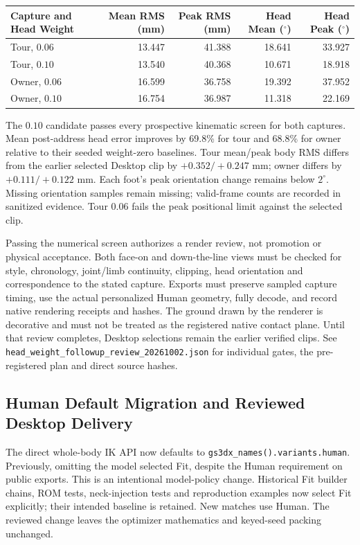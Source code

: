 \documentclass[11pt,a4paper]{article}
\begin{document}
\begin{center}
\begin{tabular}{lrrrr}
\toprule
Capture and Head Weight & Mean RMS (mm) & Peak RMS (mm) & Head Mean ($^\circ$) & Head Peak ($^\circ$) \\
\midrule
Tour, $0.06$ & 13.447 & 41.388 & 18.641 & 33.927 \\
Tour, $0.10$ & 13.540 & 40.368 & 10.671 & 18.918 \\
Owner, $0.06$ & 16.599 & 36.758 & 19.392 & 37.952 \\
Owner, $0.10$ & 16.754 & 36.987 & 11.318 & 22.169 \\
\bottomrule
\end{tabular}
\end{center}
The $0.10$ candidate passes every prospective kinematic screen for both
captures. Mean post-address head error improves by 69.8\% for tour and
68.8\% for owner relative to their seeded weight-zero baselines. Tour
mean/peak body RMS differs from the earlier selected Desktop clip by
$+0.352/+0.247$ mm; owner differs by $+0.111/+0.122$ mm. Each foot's peak
orientation change remains below $2^\circ$. Missing orientation samples
remain missing; valid-frame counts are recorded in sanitized evidence.
Tour $0.06$ fails the peak positional limit against the selected clip.

Passing the numerical screen authorizes a render review, not promotion or
physical acceptance. Both face-on and down-the-line views must be checked
for style, chronology, joint/limb continuity, clipping, head orientation
and correspondence to the stated capture. Exports must preserve sampled
capture timing, use the actual personalized Human geometry, fully decode,
and record native rendering receipts and hashes. The ground drawn by the
renderer is decorative and must not be treated as the registered native
contact plane. Until that review completes, Desktop selections remain the
earlier verified clips. See
\texttt{head\_weight\_followup\_review\_20261002.json} for individual gates,
the pre-registered plan and direct source hashes.


\subsection{Human Default Migration and Reviewed Desktop Delivery}
The direct whole-body IK API now defaults to
\texttt{gs3dx\_names().variants.human}. Previously, omitting the model
selected Fit, despite the Human requirement on public exports. This is an
intentional model-policy change. Historical Fit builder chains, ROM tests,
neck-injection tests and reproduction examples now select Fit explicitly;
their intended baseline is retained. New matches use Human. The reviewed
change leaves the optimizer mathematics and keyed-seed packing unchanged.
\end{document}
